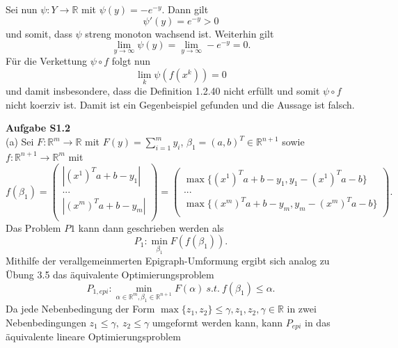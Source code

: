 \documentclass[ngerman, a4paper,12pt]{article}
\begin{document}
Sei nun $\psi : Y \rightarrow \mathbb{R}$  mit $\psi (y) = -e^{-y}$. Dann gilt
\begin{equation*}
\psi ' (y) = e^{-y} > 0
\end{equation*}
und somit, dass $\psi$ streng monoton wachsend ist. Weiterhin gilt 
\begin{equation}
\lim_{y \rightarrow \infty} \psi(y) = \lim_{y \rightarrow \infty} -e^{-y} = 0.
\end{equation}
Für die Verkettung $\psi \circ f$ folgt nun
\begin{equation}
\lim\limits_{k} \psi(f(x^k)) = 0
\end{equation}
und damit insbesondere, dass die Definition 1.2.40 nicht erfüllt und somit $\psi \circ f$ nicht koerziv ist. Damit ist ein Gegenbeispiel gefunden und die Aussage ist falsch. \par
\textbf{Aufgabe S1.2} \\
(a) Sei $F: \mathbb{R}^m \rightarrow \mathbb{R}$ mit $F(y) = \sum_{i=1}^{m}y_i$, $\beta_1 = (a, b)^T \in \mathbb{R}^{n+1}$ sowie $f: \mathbb{R}^{n+1} \rightarrow \mathbb{R}^m$ mit 
\begin{equation*}
	f(\beta_1) = 
					\begin{pmatrix}
					\left| (x^1)^Ta + b - y_1 \right| \\
					... \\
					\left| (x^m)^Ta + b - y_m \right| \\
					 \end{pmatrix} =
											 \begin{pmatrix}
											 \max\{(x^1)^Ta + b - y_1 , y_1 - (x^1)^Ta - b\} \\
											 ... \\
											 \max\{(x^m)^Ta + b - y_m , y_m - (x^m)^Ta - b\} \\
											 \end{pmatrix}.
\end{equation*}
Das Problem $P1$ kann dann geschrieben werden als
\begin{equation*}
	P_1: \min_{\beta_1} F(f(\beta_1)).
\end{equation*}
Mithilfe der verallgemeinmerten Epigraph-Umformung ergibt sich analog zu Übung 3.5 das äquivalente Optimierungsproblem
\begin{equation*}
	P_{1, epi}:\min_{\alpha \in \mathbb{R}^m, \beta_1 \in \mathbb{R}^{n+1}} F(\alpha) \ s.t. \ f(\beta_1) \leq \alpha.
\end{equation*}
Da jede Nebenbedingung der Form $\max\{z_1, z_2\} \leq \gamma, z_1, z_2, \gamma \in \mathbb{R}$ in zwei Nebenbedingungen $z_1 \leq \gamma, \ z_2 \leq \gamma$ umgeformt werden kann, kann $P_{epi}$ in das äquivalente lineare Optimierungsproblem 
\end{document}

